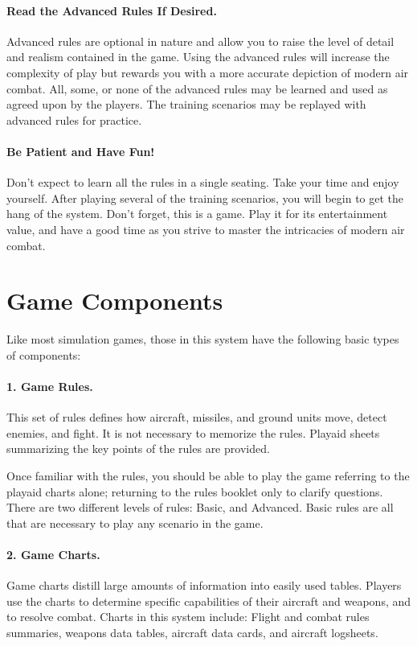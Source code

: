 \paragraph{Read the Advanced Rules If Desired.} Advanced rules are optional in nature and allow you to raise the level of detail and realism contained in the game. Using the advanced rules will increase the complexity of play but rewards you with a more accurate depiction of modern air combat. All, some, or none of the advanced rules may be learned and used as agreed upon by the players. The training scenarios may be replayed with advanced rules for practice.

\paragraph{Be Patient and Have Fun!} Don't expect to learn all the rules in a single seating. Take your time and enjoy yourself. After playing several of the training scenarios, you will begin to get the hang of the system. Don't forget, this is a game. Play it for its entertainment value, and have a good time as you strive to master the intricacies of modern air combat.

\section{Game Components}

Like most simulation games, those in this system have the following basic types of components:

\paragraph{1. Game Rules.} This set of rules defines how aircraft, missiles, and ground units move, detect enemies, and fight. It is not necessary to memorize the rules. Play{\xhyphen}aid sheets summarizing the key points of the rules are provided.

Once familiar with the rules, you should be able to play the game referring to the play{\xhyphen}aid charts alone; returning to the rules booklet only to clarify questions. There are two different levels of rules: Basic, and Advanced. Basic rules are all that are necessary to play any scenario in the game.

\paragraph{2. Game Charts.} Game charts distill large amounts of information into easily used tables. Players use the charts to determine specific capabilities of their aircraft and weapons, and to resolve combat. Charts in this system include: Flight and combat rules summaries, weapons data tables, aircraft data cards, and aircraft logsheets.

